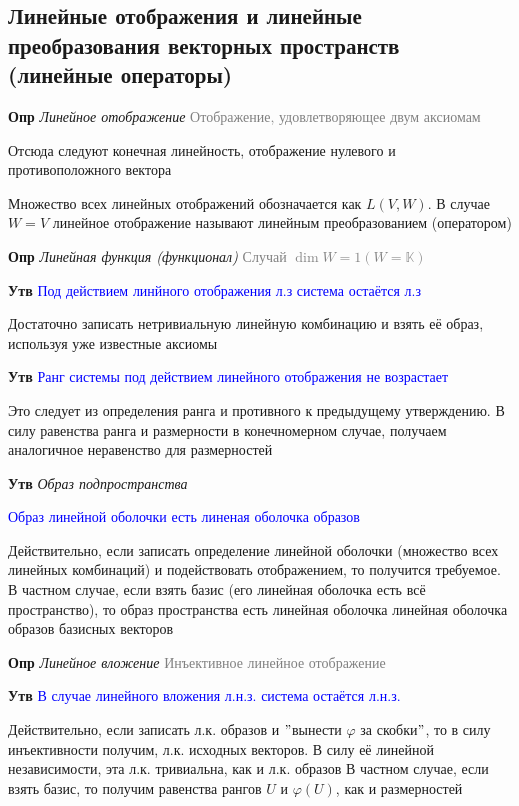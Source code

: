 \subsection{Линейные отображения и линейные преобразования векторных пространств (линейные операторы)}

\textbf{Опр} \textit{Линейное отображение} \textcolor{gray}{Отображение, удовлетворяющее двум аксиомам}

Отсюда следуют конечная линейность, отображение нулевого и противоположного вектора

Множество всех линейных отображений обозначается как $L(V, W)$.
В случае $W = V$ линейное отображение называют линейным преобразованием (оператором)

\textbf{Опр} \textit{Линейная функция (функционал)} \textcolor{gray}{Случай $\dim W = 1 (W = \mathbb{K})$}

\textbf{Утв} \textcolor{blue}{Под действием линйного отображения л.з система остаётся л.з}

Достаточно записать нетривиальную линейную комбинацию и взять её образ, используя уже известные аксиомы

\textbf{Утв} \textcolor{blue}{Ранг системы под действием линейного отображения не возрастает}

Это следует из определения ранга и противного к предыдущему утверждению.
В силу равенства ранга и размерности в конечномерном случае, получаем аналогичное неравенство для размерностей

\textbf{Утв} \textit{Образ подпространства}

\textcolor{blue}{Образ линейной оболочки есть линеная оболочка образов}

Действительно, если записать определение линейной оболочки (множество всех линейных комбинаций) и подействовать
отображением, то получится требуемое.
В частном случае, если взять базис (его линейная оболочка есть всё пространство), то образ пространства есть
линейная оболочка линейная оболочка образов базисных векторов

\textbf{Опр} \textit{Линейное вложение} \textcolor{gray}{Инъективное линейное отображение}

\textbf{Утв} \textcolor{blue}{В случае линейного вложения л.н.з. система остаётся л.н.з.}

Действительно, если записать л.к. образов и \("\)вынести $\varphi$ за скобки\("\), то в силу инъективности
получим, л.к. исходных векторов.
В силу её линейной независимости, эта л.к. тривиальна, как и л.к. образов
В частном случае, если взять базис, то получим равенства рангов $U$ и $\varphi (U)$, как и размерностей

